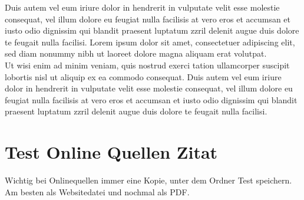 	Duis autem vel eum iriure dolor in hendrerit in vulputate velit esse molestie consequat, vel illum dolore eu feugiat nulla facilisis at vero eros et accumsan et iusto odio dignissim qui blandit praesent luptatum zzril delenit augue duis dolore te feugait nulla facilisi. Lorem ipsum dolor sit amet, consectetuer adipiscing elit, sed diam nonummy nibh  ut laoreet dolore magna aliquam erat volutpat.\\
	
	Ut wisi enim ad minim veniam, quis nostrud exerci tation ullamcorper suscipit lobortis nisl ut aliquip ex ea commodo consequat. Duis autem vel eum iriure dolor in hendrerit in vulputate velit esse molestie consequat, vel illum dolore eu feugiat nulla facilisis at vero eros et accumsan et iusto odio dignissim qui blandit praesent luptatum zzril delenit augue duis dolore te feugait nulla facilisi.
	
	\section{Test Online Quellen Zitat}
	Wichtig bei Onlinequellen immer eine Kopie, unter dem Ordner Test  speichern. Am besten als Websitedatei und nochmal als PDF.\cite{qs.koeln}